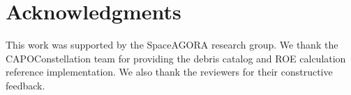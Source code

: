 \section*{Acknowledgments}

This work was supported by the SpaceAGORA research group. We thank the CAPOConstellation team for providing the debris catalog and ROE calculation reference implementation. We also thank the reviewers for their constructive feedback.
